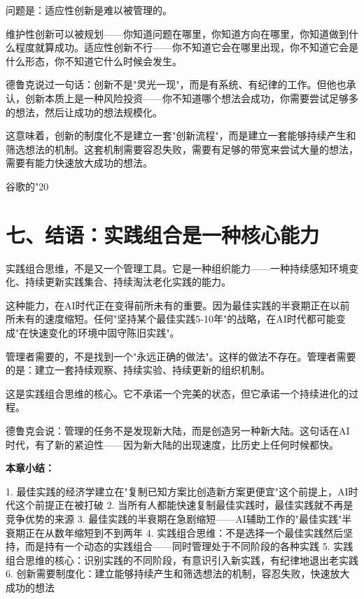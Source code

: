 问题是：适应性创新是难以被管理的。

维护性创新可以被规划——你知道问题在哪里，你知道方向在哪里，你知道做到什么程度就算成功。适应性创新不行——你不知道它会在哪里出现，你不知道它会是什么形态，你不知道它什么时候会发生。

德鲁克说过一句话：创新不是"灵光一现"，而是有系统、有纪律的工作。但他也承认，创新本质上是一种风险投资——你不知道哪个想法会成功，你需要尝试足够多的想法，然后让成功的想法规模化。

这意味着，创新的制度化不是建立一套"创新流程"，而是建立一套能够持续产生和筛选想法的机制。这套机制需要容忍失败，需要有足够的带宽来尝试大量的想法，需要有能力快速放大成功的想法。

谷歌的"20%

\section{七、结语：实践组合是一种核心能力}


实践组合思维，不是又一个管理工具。它是一种组织能力——一种持续感知环境变化、持续更新实践集合、持续淘汰老化实践的能力。

这种能力，在AI时代正在变得前所未有的重要。因为最佳实践的半衰期正在以前所未有的速度缩短。任何"坚持某个最佳实践5-10年"的战略，在AI时代都可能变成"在快速变化的环境中固守陈旧实践"。

管理者需要的，不是找到一个"永远正确的做法"。这样的做法不存在。管理者需要的是：建立一套持续观察、持续实验、持续更新的组织机制。

这是实践组合思维的核心。它不承诺一个完美的状态，但它承诺一个持续进化的过程。

德鲁克会说：管理的任务不是发现新大陆，而是创造另一种新大陆。这句话在AI时代，有了新的紧迫性——因为新大陆的出现速度，比历史上任何时候都快。


\textbf{本章小结：}

1. 最佳实践的经济学建立在"复制已知方案比创造新方案更便宜"这个前提上，AI时代这个前提正在被打破
2. 当所有人都能快速复制最佳实践时，最佳实践就不再是竞争优势的来源
3. 最佳实践的半衰期在急剧缩短——AI辅助工作的"最佳实践"半衰期正在从数年缩短到不到两年
4. 实践组合思维：不是选择一个最佳实践然后坚持，而是持有一个动态的实践组合——同时管理处于不同阶段的各种实践
5. 实践组合思维的核心：识别实践的不同阶段，有意识引入新实践，有纪律地退出老实践
6. 创新需要制度化：建立能够持续产生和筛选想法的机制，容忍失败，快速放大成功的想法
